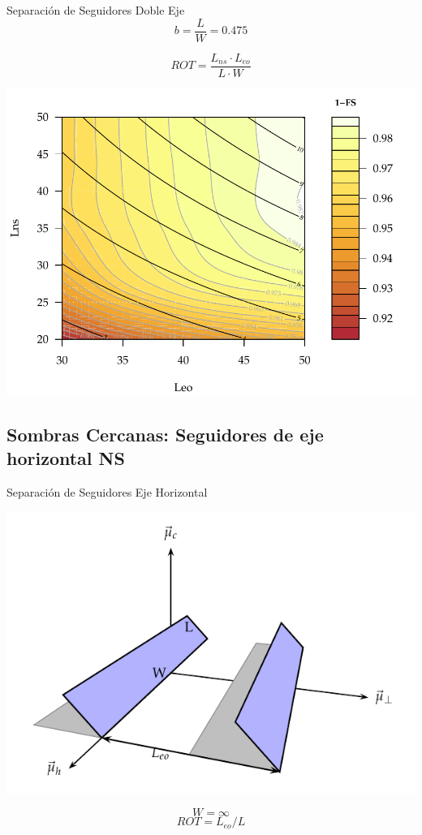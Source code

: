 \documentclass[xcolor={usenames,svgnames,dvipsnames}]{beamer}
\begin{document}
\begin{frame}[label={sec:org52c99a0}]{Separación de Seguidores Doble Eje}
$$b=\frac{L}{W}=0.475$$

$$ROT=\frac{L_{ns}\cdot L_{eo}}{L \cdot W}$$

\begin{center}
\includegraphics[width=.9\linewidth]{../figs/AbacoSeguidor2X_Ene10.pdf}
\end{center}
\end{frame}


\subsection{Sombras Cercanas: Seguidores de eje horizontal NS}
\label{sec:org5414c98}

\begin{frame}[label={sec:org7dbe8f8}]{Separación de Seguidores Eje Horizontal}
\begin{center}
\includegraphics[width=.9\linewidth]{../figs/SombrasHoriz.pdf}
\end{center}

$$W=\infty$$ $$ROT=L_{eo}/L$$
\end{frame}
\end{document}

